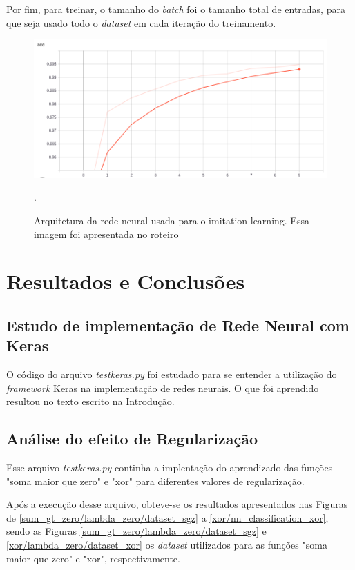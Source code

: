 \documentclass[conference]{IEEEtran}
\begin{document}
Por fim, para treinar, o tamanho do \textit{batch} foi o tamanho total de entradas, para que seja usado todo o \textit{dataset} em cada iteração do treinamento.

\begin{figure}[htbp]
\centerline{\includegraphics[scale=0.25]{imagens/acc.png}}
\caption{Arquitetura da rede neural usada para o imitation learning. Essa imagem foi apresentada no roteiro \cite{roteiro}}.
\label{acc}
\end{figure}

\section{Resultados e Conclusões}

\subsection{Estudo de implementação de Rede Neural com Keras}
O código do arquivo \textit{test\underline{\space}keras.py} foi estudado para se entender a utilização do \textit{framework} Keras na implementação de redes neurais. O que foi aprendido resultou no texto escrito na Introdução.

\subsection{Análise do efeito de Regularização}
Esse arquivo \textit{test\underline{\space}keras.py} continha a implentação do aprendizado das funções "soma maior que zero" e "xor" para diferentes valores de regularização.

Após a execução desse arquivo, obteve-se os resultados apresentados nas Figuras de \ref{sum_gt_zero/lambda_zero/dataset_sgz} a \ref{xor/nn_classification_xor}, sendo as Figuras \ref{sum_gt_zero/lambda_zero/dataset_sgz} e \ref{xor/lambda_zero/dataset_xor} os \textit{dataset} utilizados para as funções "soma maior que zero" e "xor", respectivamente.
\end{document}
